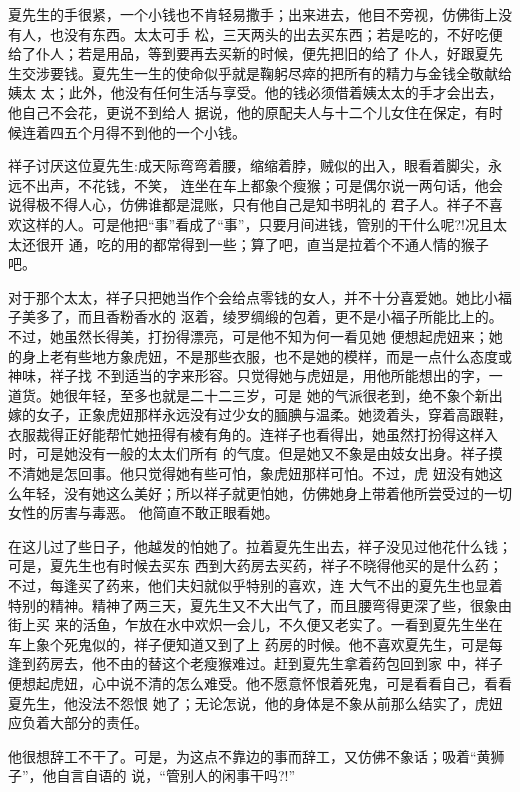 \documentclass[11pt,a4paper,onecolumn]{article}
\begin{document}
夏先生的手很紧，一个小钱也不肯轻易撒手；出来进去，他目不旁视，仿佛街上没有人，也没有东西。太太可手
松，三天两头的出去买东西；若是吃的，不好吃便给了仆人；若是用品，等到要再去买新的时候，便先把旧的给了
仆人，好跟夏先生交涉要钱。夏先生一生的使命似乎就是鞠躬尽瘁的把所有的精力与金钱全敬献给姨太
太；此外，他没有任何生活与享受。他的钱必须借着姨太太的手才会出去，他自己不会花，更说不到给人\myrule
据说，他的原配夫人与十二个儿女住在保定，有时候连着四五个月得不到他的一个小钱。

祥子讨厌这位夏先生:成天际弯弯着腰，缩缩着脖，贼似的出入，眼看着脚尖，永远不出声，不花钱，不笑，
连坐在车上都象个瘦猴；可是偶尔说一两句话，他会说得极不得人心，仿佛谁都是混账，只有他自己是知书明礼的
君子人。祥子不喜欢这样的人。可是他把``事''看成了``事''，只要月间进钱，管别的干什么呢?!况且太太还很开
通，吃的用的都常得到一些；算了吧，直当是拉着个不通人情的猴子吧。

对于那个太太，祥子只把她当作个会给点零钱的女人，并不十分喜爱她。她比小福子美多了，而且香粉香水的
沤着，绫罗绸缎的包着，更不是小福子所能比上的。不过，她虽然长得美，打扮得漂亮，可是他不知为何一看见她
便想起虎妞来；她的身上老有些地方象虎妞，不是那些衣服，也不是她的模样，而是一点什么态度或神味，祥子找
不到适当的字来形容。只觉得她与虎妞是，用他所能想出的字，一道货。她很年轻，至多也就是二十二三岁，可是
她的气派很老到，绝不象个新出嫁的女子，正象虎妞那样永远没有过少女的腼腆与温柔。她烫着头，穿着高跟鞋，
衣服裁得正好能帮忙她扭得有棱有角的。连祥子也看得出，她虽然打扮得这样入时，可是她没有一般的太太们所有
的气度。但是她又不象是由妓女出身。祥子摸不清她是怎回事。他只觉得她有些可怕，象虎妞那样可怕。不过，虎
妞没有她这么年轻，没有她这么美好；所以祥子就更怕她，仿佛她身上带着他所尝受过的一切女性的厉害与毒恶。
他简直不敢正眼看她。

在这儿过了些日子，他越发的怕她了。拉着夏先生出去，祥子没见过他花什么钱；可是，夏先生也有时候去买东
西\myrule 到大药房去买药，祥子不晓得他买的是什么药；不过，每逢买了药来，他们夫妇就似乎特别的喜欢，连
大气不出的夏先生也显着特别的精神。精神了两三天，夏先生又不大出气了，而且腰弯得更深了些，很象由街上买
来的活鱼，乍放在水中欢炽一会儿，不久便又老实了。一看到夏先生坐在车上象个死鬼似的，祥子便知道又到了上
药房的时候。他不喜欢夏先生，可是每逢到药房去，他不由的替这个老瘦猴难过。赶到夏先生拿着药包回到家
中，祥子便想起虎妞，心中说不清的怎么难受。他不愿意怀恨着死鬼，可是看看自己，看看夏先生，他没法不怨恨
她了；无论怎说，他的身体是不象从前那么结实了，虎妞应负着大部分的责任。

他很想辞工不干了。可是，为这点不靠边的事而辞工，又仿佛不象话；吸着``黄狮子''，他自言自语的
说，``管别人的闲事干吗?!''
\end{document}
